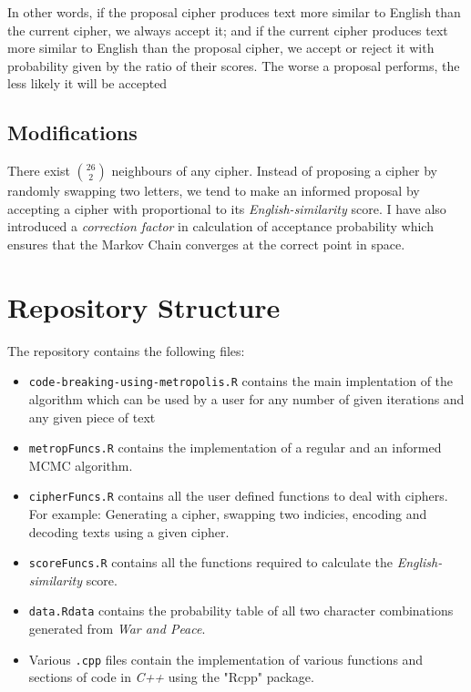 \documentclass{article}
\begin{document}
In other words, if the proposal cipher produces text more similar to English than the current cipher, we always accept it; and if the current cipher produces text more similar to English than the proposal cipher, we accept or reject it with probability given by the ratio of their scores. The worse a proposal performs, the less likely it will be accepted

\subsection{Modifications}
There exist $26 \choose 2$ neighbours of any cipher. Instead of proposing a cipher by randomly swapping two letters, we tend to make an informed proposal by accepting a cipher with proportional to its \emph{English-similarity} score. I have also introduced a \emph{correction factor} in calculation of acceptance probability which ensures that the Markov Chain converges at the correct point in space.

\section{Repository Structure}

The repository contains the following files:

\begin{itemize}
    \item \texttt{code-breaking-using-metropolis.R} contains the main implentation of the algorithm which can be used by a user for any number of given iterations and any given piece of text
    \item \texttt{metropFuncs.R} contains the implementation of a regular and an informed MCMC algorithm.
    \item \texttt{cipherFuncs.R} contains all the user defined functions to deal with ciphers. For example: Generating a cipher, swapping two indicies, encoding and decoding texts using a given cipher.
    \item \texttt{scoreFuncs.R} contains all the functions required to calculate the \emph{English-similarity} score.
    \item \texttt{data.Rdata} contains the probability table of all two character combinations generated from \emph{War and Peace}.
    \item Various \texttt{.cpp} files contain the implementation of various functions and sections of code in \emph{C++} using the "Rcpp" package.
\end{itemize}
\end{document}
